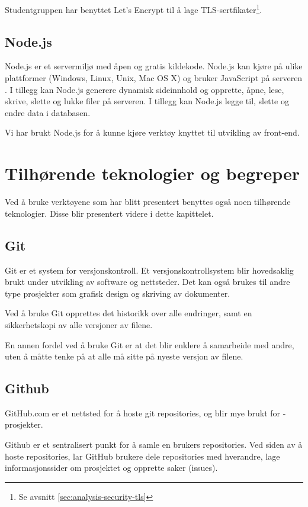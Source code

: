 Studentgruppen har benyttet Let's Encrypt til å lage TLS-sertfikater\footnote{Se avsnitt \ref{sec:analysis-security-tls}}.

\subsection{Node.js}
Node.js er et servermiljø med åpen og gratis kildekode. Node.js kan kjøre på ulike plattformer (Windows, Linux, Unix, Mac OS X) og bruker JavaScript på serveren \cite{w3schools2019win}. I tillegg kan Node.js generere dynamisk sideinnhold og opprette, åpne, lese, skrive, slette og lukke filer på serveren. I tillegg kan Node.js legge til, slette og endre data i databasen.

Vi har brukt Node.js for å kunne kjøre verktøy knyttet til utvikling av front-end.

\section{Tilhørende teknologier og begreper}
Ved å bruke verktøyene som har blitt presentert benyttes også noen tilhørende teknologier. Disse blir presentert videre i dette kapittelet. 

\subsection{Git}
Git \cite{TechTarget} er et system for versjonskontroll. Et versjonskontrollsystem blir hovedsaklig brukt under utvikling av software og nettsteder. Det kan også brukes til andre type prosjekter som grafisk design og skriving av dokumenter.

Ved å bruke Git opprettes det historikk over alle endringer, samt en sikkerhetskopi av alle versjoner av filene.

En annen fordel ved å bruke Git er at det blir enklere å samarbeide med andre, uten å måtte tenke på at alle må sitte på nyeste versjon av filene.

\subsection{Github}
GitHub.com er et nettsted for å hoste git repositories, og blir mye brukt for -prosjekter. 

Github \cite{TechTarget} er et sentralisert punkt for å samle en brukers repositories. Ved siden av å hoste repositories, lar GitHub brukere dele repositories med hverandre, lage informasjonssider om prosjektet og opprette saker (issues).

